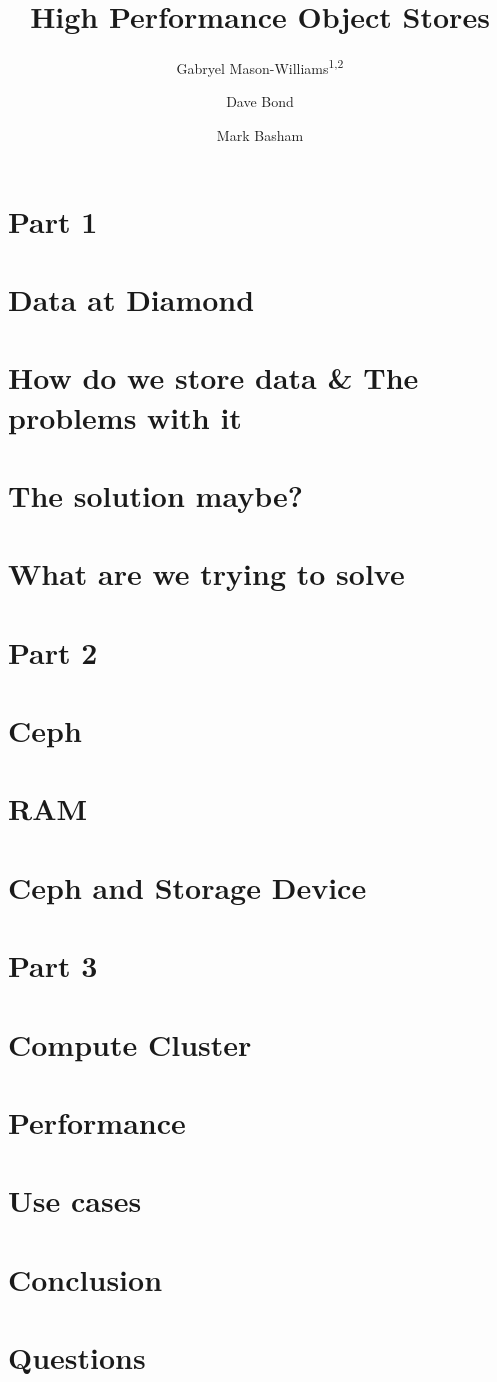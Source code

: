 \documentclass[notes,11pt]{beamer}
\title[Big Data]{High Performance Object Stores}
\author[]{Gabryel Mason-Williams\textsuperscript{1,2} \and Dave Bond \inst{1} \and Mark Basham \inst{1,3}}
\begin{document}

\section{Part 1}
\section{Data at Diamond}

\section{How do we store data \& The problems with it}

\section{The solution maybe?}

\section{What are we trying to solve}
\section{Part 2}

\section{Ceph}

\section{RAM}

\section{Ceph and Storage Device}

\section{Part 3}

\section{Compute Cluster}

\section{Performance}

\section{Use cases}

\section{Conclusion}

\section{Questions}

\end{document}
